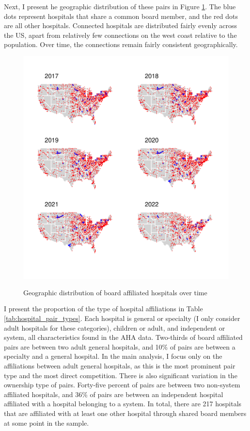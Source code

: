\documentclass[12pt]{article}
\begin{document}
    Next, I present he geographic distribution of these pairs in Figure \ref{fig:connected_maps}. The blue dots represent hospitals that share a common board member, and the red dots are all other hospitals. Connected hospitals are distributed fairly evenly across the US, apart from relatively few connections on the west coast relative to the population. Over time, the connections remain fairly consistent geographically.

    \begin{figure}[ht!]
        \centering
        \caption{Geographic distribution of board affiliated hospitals over time}
        \includegraphics[width=\textwidth]{Objects/connected_maps.pdf}
        \label{fig:connected_maps}
    \end{figure}



    I present the proportion of the type of hospital affiliations in Table \ref{tab:hospital_pair_types}. Each hospital is general or specialty (I only consider adult hospitals for these categories), children or adult, and independent or system, all characteristics found in the AHA data. Two-thirds of board affiliated pairs are between two adult general hospitals, and 10\% of pairs are between a specialty and a general hospital. In the main analysis, I focus only on the affiliations between adult general hospitals, as this is the most prominent pair type and the most direct competition. There is also significant variation in the ownership type of pairs. Forty-five percent of pairs are between two non-system affiliated hospitals, and 36\% of pairs are between an independent hospital affiliated with a hospital belonging to a system. In total, there are 217 hospitals that are affiliated with at least one other hospital through shared board members at some point in the sample. 
\end{document}
